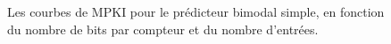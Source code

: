 \documentclass[a4paper]{article}
\begin{document}
\begin{figure}[h]
{      \label{plot3}
      }
      \caption{\label{results}Les courbes de MPKI pour le prédicteur bimodal simple, en fonction du nombre de bits par compteur et du nombre d'entrées.}
      \end{figure}
\end{document}

